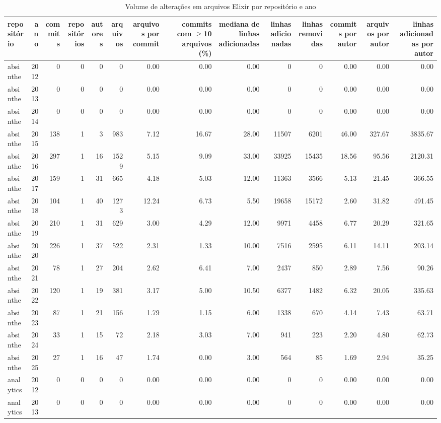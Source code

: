 \begin{table}[htbp]
\centering
\caption{Volume de alterações em arquivos Elixir por repositório e ano}
\label{tab:volume_repos}
\begin{tabular}{lrrrrrrrrrrrrr}
\toprule
repositório & ano & commits & repositórios & autores & arquivos & arquivos por commit & commits com $\geq$10 arquivos (\%) & mediana de linhas adicionadas & linhas adicionadas & linhas removidas & commits por autor & arquivos por autor & linhas adicionadas por autor \\
\midrule
absinthe & 2012 & 0 & 0 & 0 & 0 & 0.00 & 0.00 & 0.00 & 0 & 0 & 0.00 & 0.00 & 0.00 \\
absinthe & 2013 & 0 & 0 & 0 & 0 & 0.00 & 0.00 & 0.00 & 0 & 0 & 0.00 & 0.00 & 0.00 \\
absinthe & 2014 & 0 & 0 & 0 & 0 & 0.00 & 0.00 & 0.00 & 0 & 0 & 0.00 & 0.00 & 0.00 \\
absinthe & 2015 & 138 & 1 & 3 & 983 & 7.12 & 16.67 & 28.00 & 11507 & 6201 & 46.00 & 327.67 & 3835.67 \\
absinthe & 2016 & 297 & 1 & 16 & 1529 & 5.15 & 9.09 & 33.00 & 33925 & 15435 & 18.56 & 95.56 & 2120.31 \\
absinthe & 2017 & 159 & 1 & 31 & 665 & 4.18 & 5.03 & 12.00 & 11363 & 3566 & 5.13 & 21.45 & 366.55 \\
absinthe & 2018 & 104 & 1 & 40 & 1273 & 12.24 & 6.73 & 5.50 & 19658 & 15172 & 2.60 & 31.82 & 491.45 \\
absinthe & 2019 & 210 & 1 & 31 & 629 & 3.00 & 4.29 & 12.00 & 9971 & 4458 & 6.77 & 20.29 & 321.65 \\
absinthe & 2020 & 226 & 1 & 37 & 522 & 2.31 & 1.33 & 10.00 & 7516 & 2595 & 6.11 & 14.11 & 203.14 \\
absinthe & 2021 & 78 & 1 & 27 & 204 & 2.62 & 6.41 & 7.00 & 2437 & 850 & 2.89 & 7.56 & 90.26 \\
absinthe & 2022 & 120 & 1 & 19 & 381 & 3.17 & 5.00 & 10.50 & 6377 & 1482 & 6.32 & 20.05 & 335.63 \\
absinthe & 2023 & 87 & 1 & 21 & 156 & 1.79 & 1.15 & 6.00 & 1338 & 670 & 4.14 & 7.43 & 63.71 \\
absinthe & 2024 & 33 & 1 & 15 & 72 & 2.18 & 3.03 & 7.00 & 941 & 223 & 2.20 & 4.80 & 62.73 \\
absinthe & 2025 & 27 & 1 & 16 & 47 & 1.74 & 0.00 & 3.00 & 564 & 85 & 1.69 & 2.94 & 35.25 \\
analytics & 2012 & 0 & 0 & 0 & 0 & 0.00 & 0.00 & 0.00 & 0 & 0 & 0.00 & 0.00 & 0.00 \\
analytics & 2013 & 0 & 0 & 0 & 0 & 0.00 & 0.00 & 0.00 & 0 & 0 & 0.00 & 0.00 & 0.00 \\

\end{tabular}
\end{table}
